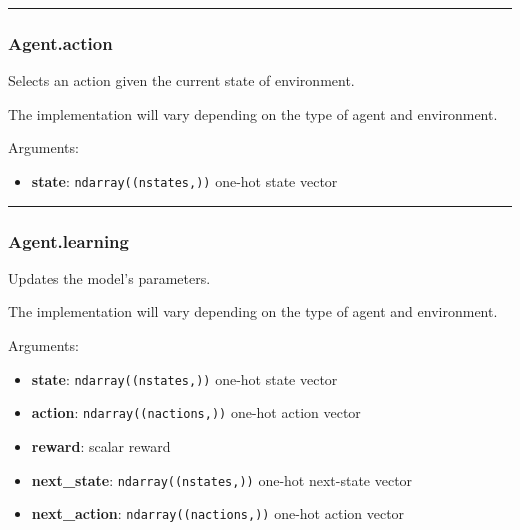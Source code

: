 \begin{center}\rule{0.5\linewidth}{\linethickness}\end{center}

\subsubsection{Agent.action}\label{agent.action}

\begin{Shaded}
\begin{Highlighting}[]
\end{Highlighting}
\end{Shaded}

Selects an action given the current state of environment.

The implementation will vary depending on the type of agent and
environment.

Arguments:

\begin{itemize}
\tightlist
\item
  \textbf{state}: \texttt{ndarray((nstates,))} one-hot state vector
\end{itemize}

\begin{center}\rule{0.5\linewidth}{\linethickness}\end{center}

\subsubsection{Agent.learning}\label{agent.learning}

\begin{Shaded}
\begin{Highlighting}[]
\end{Highlighting}
\end{Shaded}

Updates the model's parameters.

The implementation will vary depending on the type of agent and
environment.

Arguments:

\begin{itemize}
\tightlist
\item
  \textbf{state}: \texttt{ndarray((nstates,))} one-hot state vector
\item
  \textbf{action}: \texttt{ndarray((nactions,))} one-hot action vector
\item
  \textbf{reward}: scalar reward
\item
  \textbf{next\_state}: \texttt{ndarray((nstates,))} one-hot next-state
  vector
\item
  \textbf{next\_action}: \texttt{ndarray((nactions,))} one-hot action
  vector
\end{itemize}

